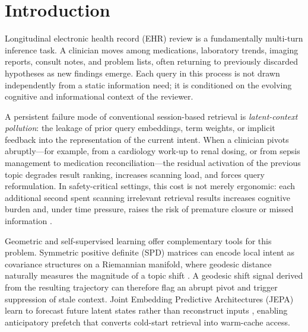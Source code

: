 \documentclass[preprint,12pt]{elsarticle}
\begin{document}
\section{Introduction}
Longitudinal electronic health record (EHR) review is a fundamentally multi-turn inference task. A clinician moves among medications, laboratory trends, imaging reports, consult notes, and problem lists, often returning to previously discarded hypotheses as new findings emerge. Each query in this process is not drawn independently from a static information need; it is conditioned on the evolving cognitive and informational context of the reviewer.

A persistent failure mode of conventional session-based retrieval is \emph{latent-context pollution}: the leakage of prior query embeddings, term weights, or implicit feedback into the representation of the current intent. When a clinician pivots abruptly---for example, from a cardiology work-up to renal dosing, or from sepsis management to medication reconciliation---the residual activation of the previous topic degrades result ranking, increases scanning load, and forces query reformulation. In safety-critical settings, this cost is not merely ergonomic: each additional second spent scanning irrelevant retrieval results increases cognitive burden and, under time pressure, raises the risk of premature closure or missed information \citep{topol2019}.

Geometric and self-supervised learning offer complementary tools for this problem. Symmetric positive definite (SPD) matrices can encode local intent as covariance structures on a Riemannian manifold, where geodesic distance naturally measures the magnitude of a topic shift \citep{bronstein2017,lopez2021,nickel2017_poincare}. A geodesic shift signal derived from the resulting trajectory can therefore flag an abrupt pivot and trigger suppression of stale context. Joint Embedding Predictive Architectures (JEPA) learn to forecast future latent states rather than reconstruct inputs \citep{lecun2022,assran2023_ijepa}, enabling anticipatory prefetch that converts cold-start retrieval into warm-cache access.
\end{document}
